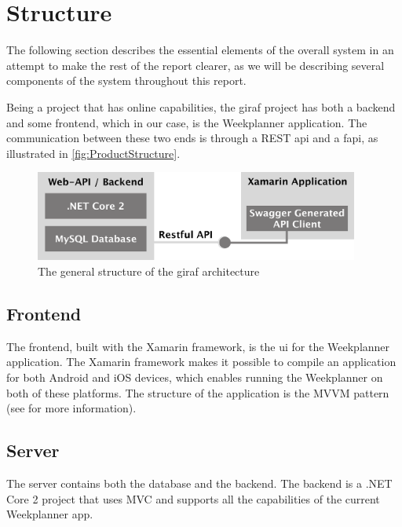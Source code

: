 \section{Structure}

The following section describes the essential elements of the overall system in an attempt to make the rest of the report clearer, as we will be describing several components of the system throughout this report.

Being a project that has online capabilities, the \gls{giraf} project has both a backend and some frontend, which in our case, is the Weekplanner application. The communication between these two ends is through a REST \gls{api} and a \gls{fapi}, as illustrated in \autoref{fig:ProductStructure}.

\begin{figure}[H]
    \begin{center}
        \includegraphics[width=0.95\textwidth]{figures/system_overview.pdf}
    \end{center}
    \caption{The general structure of the \gls{giraf} architecture}
    \label{fig:ProductStructure}
\end{figure}

\subsection{Frontend}

The frontend, built with the Xamarin framework, is the \gls{ui} for the Weekplanner application. The Xamarin framework makes it possible to compile an application for both Android and iOS devices, which enables running the Weekplanner on both of these platforms. The structure of the application is the MVVM pattern (see \cite{davidbritch_model-view-viewmodel} for more information).

\subsection{Server}

The server contains both the database and the backend. The backend is a .NET Core 2 project that uses MVC \cite{ardalis_overview} and supports all the capabilities of the current Weekplanner app.


